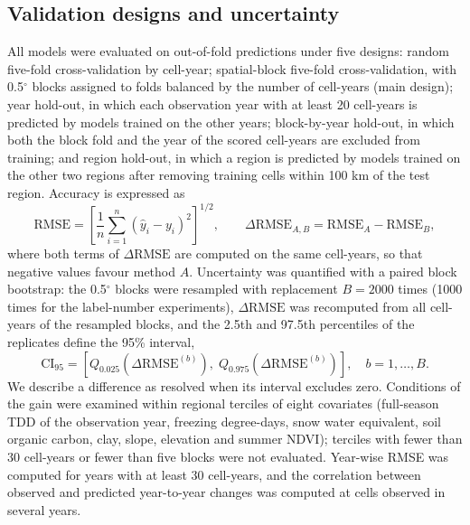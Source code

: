 \subsection{Validation designs and uncertainty}
All models were evaluated on out-of-fold predictions under five designs\cite{Roberts2017,Ploton2020}: random five-fold cross-validation by cell-year; spatial-block five-fold cross-validation, with 0.5$^\circ$ blocks assigned to folds balanced by the number of cell-years (main design); year hold-out, in which each observation year with at least 20 cell-years is predicted by models trained on the other years; block-by-year hold-out, in which both the block fold and the year of the scored cell-years are excluded from training; and region hold-out, in which a region is predicted by models trained on the other two regions after removing training cells within 100 km of the test region. Accuracy is expressed as
\begin{equation}
\mathrm{RMSE} = \left[ \frac{1}{n} \sum_{i=1}^{n} \left( \hat{y}_i - y_i \right)^{2} \right]^{1/2}, \qquad \Delta\mathrm{RMSE}_{A,B} = \mathrm{RMSE}_{A} - \mathrm{RMSE}_{B},
\label{eq:rmse}
\end{equation}
where both terms of $\Delta\mathrm{RMSE}$ are computed on the same cell-years, so that negative values favour method $A$. Uncertainty was quantified with a paired block bootstrap: the 0.5$^\circ$ blocks were resampled with replacement $B=2000$ times (1000 times for the label-number experiments), $\Delta\mathrm{RMSE}$ was recomputed from all cell-years of the resampled blocks, and the 2.5th and 97.5th percentiles of the replicates define the 95\% interval,
\begin{equation}
\mathrm{CI}_{95} = \left[ Q_{0.025}\!\left( \Delta\mathrm{RMSE}^{(b)} \right),\; Q_{0.975}\!\left( \Delta\mathrm{RMSE}^{(b)} \right) \right], \quad b = 1,\ldots,B.
\label{eq:ci}
\end{equation}
We describe a difference as resolved when its interval excludes zero. Conditions of the gain were examined within regional terciles of eight covariates (full-season TDD of the observation year, freezing degree-days, snow water equivalent, soil organic carbon, clay, slope, elevation and summer NDVI); terciles with fewer than 30 cell-years or fewer than five blocks were not evaluated. Year-wise RMSE was computed for years with at least 30 cell-years, and the correlation between observed and predicted year-to-year changes was computed at cells observed in several years.

